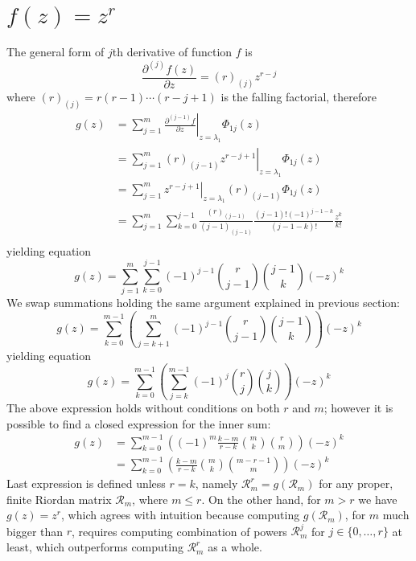 \section{$f(z)=z^{r}$}

The general form of $j$th derivative of function $f$ is 
$$\frac{\partial^{(j)}{f}(z)}{\partial{z}} = (r)_{(j)} z^{r-j}$$ 
where $(r)_{(j)} = r(r-1)\cdots(r-j+1)$ is the falling factorial, therefore
\begin{displaymath}
\begin{split}
  g(z) &= \sum_{j=1}^{m}{ \left. \frac{\partial^{(j-1)}{f}}{\partial{z}} \right|_{z=\lambda_{1}}\Phi_{1j}(z)} \\
       &= \sum_{j=1}^{m}{ \left. (r)_{(j-1)} z^{r-j+1} \right|_{z=\lambda_{1}}\Phi_{1j}(z)} \\
       &= \sum_{j=1}^{m}{ \left. z^{r-j+1} \right|_{z=\lambda_{1}}(r)_{(j-1)} \Phi_{1j}(z)} \\
       &= \sum_{j=1}^{m}{\sum_{k=0}^{j-1}{\frac{(r)_{(j-1)}}{(j-1)_{(j-1)}}\frac{(j-1)!(-1)^{j-1-k}}{(j-1-k)!}\frac{z^{k}}{k!}}} \\
\end{split}
\end{displaymath}
yielding equation
\begin{equation}
  g(z) = \sum_{j=1}^{m}{\sum_{k=0}^{j-1}{(-1)^{j-1}{{r}\choose{j-1}}{{j-1}\choose{k}}(-z)^{k}}} 
\end{equation}
We swap summations holding the same argument explained in previous section:
\begin{displaymath}
  g(z) = \sum_{k=0}^{m-1}{\left(\sum_{j=k+1}^{m}{(-1)^{j-1}{{r}\choose{j-1}}{{j-1}\choose{k}}}\right)(-z)^{k}}
\end{displaymath}
yielding equation
\begin{equation}
  g(z) = \sum_{k=0}^{m-1}{\left(\sum_{j=k}^{m-1}{(-1)^{j}{{r}\choose{j}}{{j}\choose{k}}}\right)(-z)^{k}}
\end{equation}
The above expression holds without conditions on both $r$ and $m$; however it is possible 
to find a closed expression for the inner sum:
\begin{eqnarray}
  g(z) &= \sum_{k=0}^{m-1}{\left(\left(-1\right)^{m}\frac{ k - m }{r-k}{\binom{m}{k}} {\binom{r}{m}}\right)(-z)^{k}}\\
       &= \sum_{k=0}^{m-1}{\left(\frac{ k - m }{r-k}{\binom{m}{k}} {\binom{m-r-1}{m}}\right)(-z)^{k}}
\end{eqnarray}
Last expression is defined unless $r=k$, namely $\mathcal{R}_{m}^{r}=g(\mathcal{R}_{m})$ for any proper, 
finite Riordan matrix $\mathcal{R}_{m}$, where $m\leq r$. On the other hand, for $m>r$ we have 
$g(z)=z^{r}$, which agrees with intuition because computing $g(\mathcal{R}_{m})$, for $m$ much bigger than $r$, 
requires computing combination of powers $\mathcal{R}_{m}^{j}$ for $j\in \lbrace 0,\ldots,r \rbrace$ at least,
which outperforms computing $\mathcal{R}_{m}^{r}$ as a whole.

